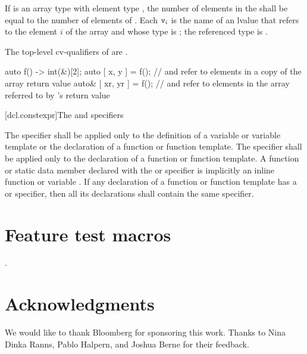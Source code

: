 \documentclass{wg21}
\begin{document}
\pnum
If  is an array type with element type , the number
of elements in the  shall be equal to the
number of elements of . Each $\texttt{v}_i$ is the name of an
lvalue that refers to the element $i$ of the array and whose type
is ; the referenced type is .
\begin{note}
    The top-level cv-qualifiers of  are \cv.
\end{note}
\begin{example}
    \begin{codeblock}
        auto f() -> int(&)[2];
        auto [ x, y ] = f();            //  and  refer to elements in a copy of the array return value
        auto& [ xr, yr ] = f();         //  and  refer to elements in the array referred to by 's return value
    \end{codeblock}
\end{example}


[dcl.constexpr]{The  and  specifiers}%

\pnum
The  specifier shall be applied only to
the definition of a variable or variable template or
the declaration of a function or function template.
The  specifier shall be applied only to
the declaration of a function or function template.
A function or static data member
declared with the  or  specifier
is implicitly an inline function or variable .
If any declaration of a function or function template has
a  or  specifier,
then all its declarations shall contain the same specifier.


\section{Feature test macros}

.


\section{Acknowledgments}

We would like to thank Bloomberg for sponsoring this work.
Thanks to Nina Dinka Ranns, Pablo Halpern, and Joshua Berne for their feedback.
\end{document}
